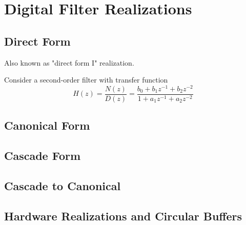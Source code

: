 \section{Digital Filter Realizations}
\subsection{Direct Form}
Also known as "direct form I" realization.

Consider a second-order filter with transfer function
\[
	H(z) = \frac{N(z)}{D(z)} 
		 = \frac{b_0 + b_1z^{-1} + b_2z^{-2}}{1 + a_1z^{-1} + a_2z^{-2}}
\]

\subsection{Canonical Form}
\subsection{Cascade Form}
\subsection{Cascade to Canonical}
\subsection{Hardware Realizations and Circular Buffers}


